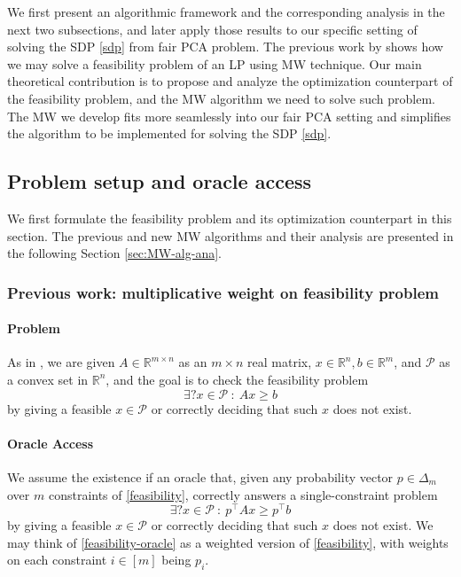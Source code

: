 \documentclass{article}
\newcommand{\cP}{\mathcal{P}}
\newcommand{\R}{\mathbb{R}}
\begin{document}
We first present an algorithmic framework and the corresponding analysis in the next two subsections, and later apply those results to our specific setting of solving the SDP \eqref{sdp} from fair PCA problem. The previous work by  \citet{arora2012multiplicative} shows how we may solve a feasibility problem of an LP using MW technique. Our main theoretical contribution is to propose and analyze the optimization counterpart of the feasibility problem, and the MW algorithm we need to solve such problem. The MW we develop fits more seamlessly into our fair PCA setting and simplifies the algorithm to be implemented for solving the SDP \eqref{sdp}.

\subsection{Problem setup and oracle access}
We first formulate the feasibility problem and its optimization counterpart in this section. The previous and new MW algorithms and their analysis are presented in the following Section \ref{sec:MW-alg-ana}.
\subsubsection{Previous work: multiplicative weight on feasibility problem}
\paragraph{Problem} As in \citet{arora2012multiplicative}, we are given \(A\in \R^{m\times n}\) as an \(m\times n\) real matrix, \(x\in \R^n,b\in\R^m\), and \(\cP\) as a convex set in \(\R^n\), and the goal is to check the feasibility problem
\begin{equation}
\exists?  x\in \cP \ : \ Ax \geq b \label{feasibility}
\end{equation}
by giving a feasible \(x\in\cP\) or correctly deciding that such \(x\) does not exist.

\paragraph{Oracle Access} We assume the existence if an oracle that, given any probability vector \(p\in \Delta_m\) over \(m\) constraints of \eqref{feasibility}, correctly answers a single-constraint problem
\begin{equation}
\exists?  x\in \cP \ : \ p^\top Ax \geq p^\top b   \label{feasibility-oracle}
\end{equation}
by giving a feasible \(x\in\cP\) or correctly deciding that such \(x\) does not exist. We may think of \eqref{feasibility-oracle}  as a weighted version of \eqref{feasibility}, with weights on each constraint \(i\in[m]\) being \(p_i\).
\end{document}
